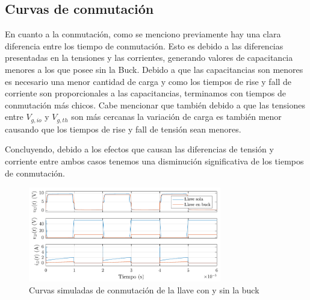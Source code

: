 \documentclass[e4_tp1_main.tex]{subfiles}
\begin{document}
\subsection{Curvas de conmutaci\'on}

En cuanto a la conmutación, como se menciono previamente hay una clara diferencia entre los tiempo de conmutación. Esto es debido a las diferencias presentadas en la tensiones y las corrientes, generando valores de capacitancia menores a los que posee sin la Buck. Debido a que las capacitancias son menores es necesario una menor cantidad de carga y como los tiempos de rise y fall de corriente son proporcionales a las capacitancias, terminamos con tiempos de conmutación más chicos. Cabe mencionar que también debido a que las  tensiones entre $V_{g,io}$ y $V_{g,th}$ son más cercanas la variación de carga es también menor causando que los tiempos de rise y fall de tensión sean menores. 

Concluyendo, debido a los efectos que causan las diferencias de tensión y corriente entre ambos casos tenemos una disminución significativa de los tiempos de conmutación.




	\begin{figure}[ht]
		\centering
		\includegraphics[width=0.75\textwidth]{images/ej3/conmutacion3.pdf}
		\caption{Curvas simuladas de conmutaci\'on de la llave con y sin la buck}
		\label{fig:curvas3}
	\end{figure}
\end{document}
